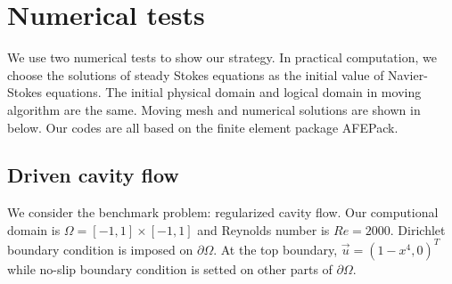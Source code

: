 \documentclass{eajam}
\begin{document}
\section{Numerical tests}
      \label{sec5} We use two numerical tests to show our strategy.
      In practical computation, we choose the solutions of steady
      Stokes equations as the initial value of Navier-Stokes
      equations. The initial physical domain
      and logical domain in moving algorithm are the same. Moving mesh
      and numerical solutions are shown in below. Our codes are all
      based on the finite element package AFEPack.

     \subsection{Driven cavity flow}
       We consider the benchmark problem: regularized cavity flow. Our
       computional domain is $\Omega = [-1, 1] \times [-1, 1]$ and
       Reynolds number is $Re = 2000$. Dirichlet boundary condition is
       imposed on $\partial \Omega$. At the top boundary, $\vec{u} =
       (1 - x^4, 0)^T$ while no-slip boundary condition is setted on
       other parts of $\partial \Omega$.
       
\end{document}
